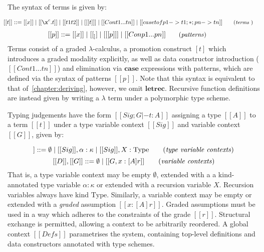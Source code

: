The syntax of terms is given by:

\begin{align*}
        \hspace{-0.8em} [[ t ]] ::= \;
               & [[ x ]]
          \mid [[ \x ^ c . t ]]
          \mid [[ t1 t2 ]]
          \mid [[ [t] ]]
          \mid [[ Con t1 ... tn ]]
          \mid [[ case t of p1 -> t1 ; * ; pn -> tn  ]]
        {\small{\tag{\textit{terms} }}}
\end{align*}
\begin{align*}
  \vspace{-1em}
        \hspace{-0.8em} [[ p ]] ::= \;
               & [[ x ]]
          \mid [[ _ ]]
          \mid [[ [p] ]]
          \mid [[ Con p1 ... pn ]]
        {\small{\tag{\textit{patterns}}}}
\end{align*}
Terms consist of a graded $\lambda$-calculus, a promotion construct $[t]$ which
 introduces a graded modality explicitly, as well as data constructor
 introduction ($[[ Con t1 ... tn ]]$) and elimination via $\textbf{case}$
 expressions with patterns, which are defined via the syntax of patterns $[[ p
 ]]$. Note that this syntax is equivalent to that of~\ref{chapter:deriving},
 however, we omit $\textbf{letrec}$. Recursive function
 definitions are instead given by writing a $\lambda$ term under a polymorphic
 type scheme. 

Typing judgements have the form $[[  Sig ; G |- t : A ]]$ assigning a type $[[ A
]]$ to a term $ [[ t ]]$ under a type variable context $[[ Sig ]]$ and variable context
$[[ G ]]$, given by:

\begin{equation*}
  [[ Sig ]] ::= \emptyset
  \mid [[ Sig ]], \alpha : \kappa
  \mid [[ Sig ]], X : \text{Type}
\tag{\textit{type variable contexts}}
\end{equation*}
\begin{equation*}
  \vspace{-1em}
  [[ D ]], [[ G ]] ::= \emptyset
  \mid [[ G , x : [ A ] r ]]
\tag{\textit{variable contexts}}
\end{equation*}
%
That is, a type variable context may be empty $\emptyset$, extended with a a
kind-annotated type variable $\alpha : \kappa$ or extended with a recursion
variable $X$. Recursion variables always have kind $\text{Type}$. Similarly, a
variable context may be empty or extended with a \textit{graded} assumption $ [[
x : [A] r ]]$. Graded assumptions must be used in a way which adheres to the
constraints of the grade $[[ r ]]$. Structural exchange is permitted, allowing a
context to be arbitrarily reordered. A global context $[[ Defs ]]$ parametrises
the system, containing top-level definitions and data constructors annotated
with type schemes. 

